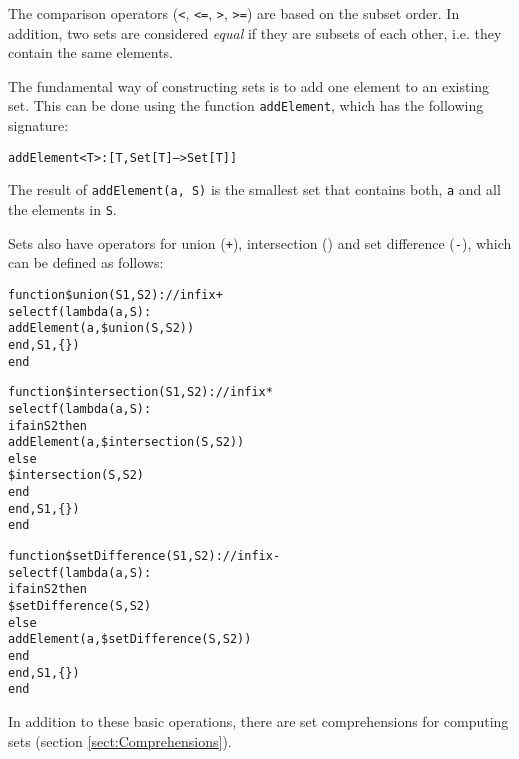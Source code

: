 
The comparison operators ({\tt <}, {\tt <=},
{\tt >}, {\tt >=}) are based on the subset order. In addition, two
sets are considered {\em equal} if they are subsets of each other,
i.e. they contain the same elements.


The fundamental way of constructing sets is
to add one element to an existing set. This can be done using the
function {\tt addElement}, which has the following signature:
\begin{alltt}
  addElement<T> : [T, Set[T] --> Set[T]]
\end{alltt}
The result of {\tt addElement(a, S)} is the smallest set that contains
both, {\tt a} and all the elements in {\tt S}.



Sets also have operators for union ({\tt +}), intersection ({\tt *})
and set difference ({\tt -}), which can be defined as follows:

\begin{alltt}function \$union (S1, S2) : // infix +
    selectf(lambda(a, S) :
                addElement(a, \$union(S, S2))
            end, S1, \{\})
end

function \$intersection(S1, S2) : // infix *
    selectf(lambda(a, S) :
                if a in S2 then
                    addElement(a, \$intersection(S, S2))
                else              
                    \$intersection(S, S2)
                end
            end, S1, \{\})
end

function \$setDifference(S1, S2) : // infix -
    selectf(lambda(a, S) :
                if a in S2 then
                    \$setDifference(S, S2)
                else
                    addElement(a, \$setDifference(S, S2))
                end
            end, S1, \{\})
end      
\end{alltt}



In addition to these basic operations, there are set comprehensions
for computing sets (section \ref{sect:Comprehensions}).

